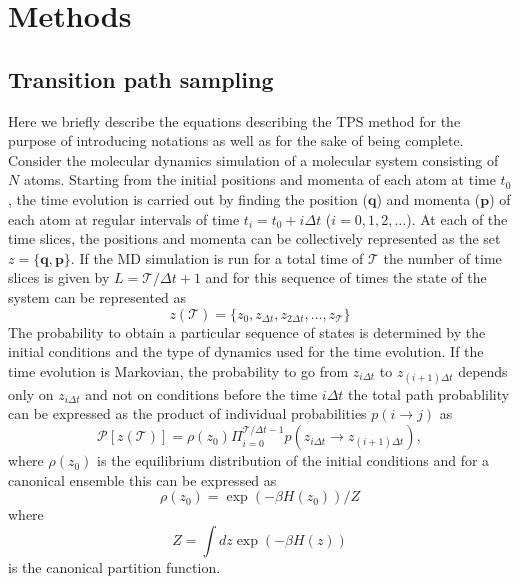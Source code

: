 \documentclass[journal=jpcbfk,manuscript=article,layout=twocolumn]{achemso}
\begin{document}
\section{Methods}
\subsection{Transition path sampling}
Here we briefly describe the equations describing the TPS method for the purpose of
introducing notations as well as for the sake of being complete. 
Consider the molecular dynamics simulation of a molecular system consisting 
of $N$ atoms. Starting from the initial positions and momenta of each atom at time $t_0$,
the time evolution is carried out by finding the position ($\textbf{q}$) and 
momenta ($\textbf{p}$) of each atom at regular intervals of time $t_i = t_0 + i\Delta t$  
($i = 0,1,2,\ldots$). At each of the time slices, the positions and 
momenta can be collectively represented as
the set $z = \{\textbf{q},\textbf{p}\}$. If the MD simulation is 
run for a total 
time of $\mathcal{T}$ the number of time slices is given by 
$L = \mathcal{T}/\Delta t +1$ and for this sequence of 
times the state of the system can be represented as 
\begin{equation}
z(\mathcal{T}) = \{z_0, z_{\Delta t}, z_{2\Delta t},\ldots,z_{\mathcal{T}}\}
\end{equation}
The probability to obtain a particular sequence of states is determined by the initial 
conditions and the type of dynamics used for the time evolution. If the time evolution is 
Markovian, the probability to go from $z_{i\Delta t}$ to $z_{(i+1)\Delta t}$ depends only 
on $z_{i\Delta t}$ and not on conditions before the time $i\Delta t$ the total path probablility can 
be expressed as the product of individual probabilities $p(i\rightarrow j)$ as 
\begin{equation}
\mathcal{P}[z(\mathcal{T})] = \rho(z_0)\Pi_{i=0}^{\mathcal{T}/\Delta t-1} p(z_{i\Delta t}\rightarrow z_{(i+1)\Delta t}),
\end{equation}
where $\rho(z_0)$ is the equilibrium distribution of the initial conditions and for a canonical ensemble this can be 
expressed as 
\begin{equation}
\rho(z_0) = \exp(-\beta H(z_0))/Z
\end{equation}
where 
\begin{equation}
Z = \int dz \exp(-\beta H(z)) 
\end{equation}
is the canonical partition function. 
\end{document}
